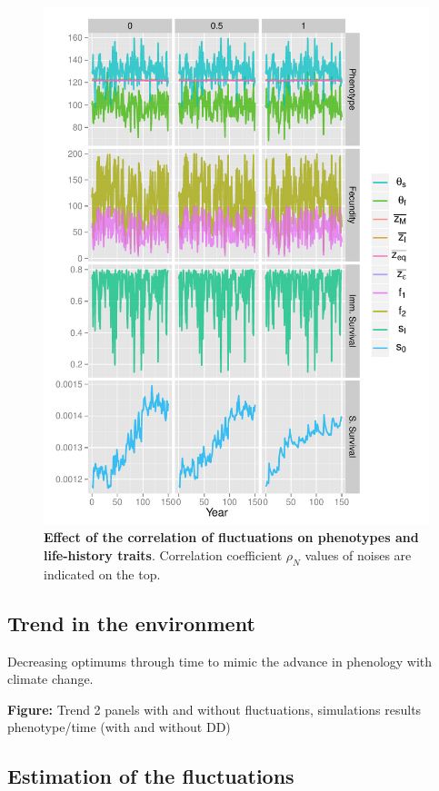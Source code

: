 \begin{figure}[ht!]
	\centering
	\label{fig:corr}
	\includegraphics[scale=1]{Figures/PhenoLHTwithCorr.pdf}
	\caption{\textbf{Effect of the correlation of fluctuations on phenotypes and life-history traits}. Correlation coefficient $\rho_{N}$ values of noises are indicated on the top.}
\end{figure}

\subsection*{Trend in the environment}

Decreasing optimums through time to mimic the advance in phenology with climate change.

\textbf{Figure:} Trend 2 panels with and without fluctuations, simulations results phenotype/time (with and without DD)

\subsection*{Estimation of the fluctuations}


